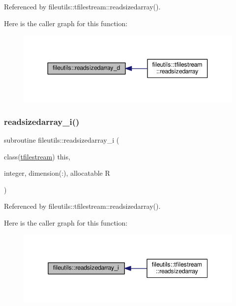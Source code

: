 Referenced by fileutils\+::tfilestream\+::readsizedarray().

Here is the caller graph for this function\+:
\nopagebreak
\begin{figure}[H]
\begin{center}
\leavevmode
\includegraphics[width=344pt]{namespacefileutils_ab663b9fbd43f12bd0ad8fdda4c1ff85e_icgraph}
\end{center}
\end{figure}
\mbox{\label{namespacefileutils_a767a096f95f5ccbb1c02deb7d926032b}} 
\subsubsection{\texorpdfstring{readsizedarray\+\_\+i()}{readsizedarray\_i()}}
{\footnotesize\ttfamily subroutine fileutils\+::readsizedarray\+\_\+i (\begin{DoxyParamCaption}\item[{class(\mbox{\hyperlink{structfileutils_1_1tfilestream}{tfilestream}})}]{this,  }\item[{integer, dimension(\+:), allocatable}]{R }\end{DoxyParamCaption})\hspace{0.3cm}{\ttfamily [private]}}



Referenced by fileutils\+::tfilestream\+::readsizedarray().

Here is the caller graph for this function\+:
\nopagebreak
\begin{figure}[H]
\begin{center}
\leavevmode
\includegraphics[width=342pt]{namespacefileutils_a767a096f95f5ccbb1c02deb7d926032b_icgraph}
\end{center}
\end{figure}
\mbox{\label{namespacefileutils_a9d5d97346bddaa16024b5482cc1ce7cb}} 
